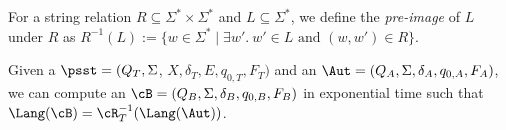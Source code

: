   
  
\begin{definition}
For a string relation $R \subseteq \Sigma^* \times \Sigma^*$ and $L \subseteq \Sigma^*$, we define the \emph{pre-image} of $L$ under $R$ as $R^{-1}(L):=\{w \in \Sigma^* \mid \exists w'.\ w' \in L \mbox{ and } (w, w') \in R\}$. 
\end{definition}
 
\begin{theorem}
  \label{theorem:psst_preimage}
  Given a \PSST{} $\psst = (Q_T, \Sigma$, $X, \delta_T, E,  q_{0, T}, F_T)$ and an \FA{} $\Aut
  = (Q_A, \Sigma, \delta_A, q_{0, A}, F_A)$, we can compute an \FA{} $\cB = (Q_B,
  \Sigma, \delta_B, q_{0, B}, F_B)$ in exponential time  such that $\Lang(\cB) = \cR^{-1}_T(\Lang(\Aut))$.
\end{theorem}
 
